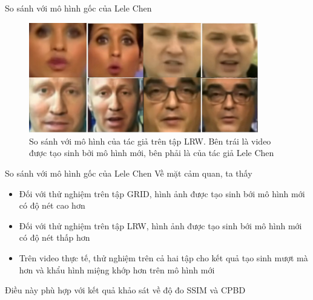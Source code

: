 \begin{frame}{So sánh với mô hình gốc của Lele Chen}
    \begin{figure}[H]
        \centering
        \includegraphics[width=10cm]{images/comparision-lrw.png}
        \caption{So sánh với mô hình của tác giả trên tập LRW. Bên trái là video được tạo sinh bởi mô hình mới, bên phải là của tác giả Lele Chen}
    \end{figure}
\end{frame}

\begin{frame}{So sánh với mô hình gốc của Lele Chen}
Về mặt cảm quan, ta thấy
\begin{itemize}
    \item Đối với thử nghiệm trên tập GRID, hình ảnh được tạo sinh bới mô hình mới có độ nét cao hơn
    \item Đối với thử nghiệm trên tập LRW, hình ảnh được tạo sinh bới mô hình mới có độ nét thấp hơn
    \item Trên video thực tế, thử nghiệm trên cả hai tập cho kết quả tạo sinh mượt mà hơn và khẩu hình miệng khớp hơn trên mô hình mới
\end{itemize}
Điều này phù hợp với kết quả khảo sát về độ đo SSIM và CPBD
\end{frame}
